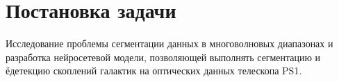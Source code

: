 \chapter{Постановка задачи}
\label{cha:ch_1}

Исследование проблемы сегментации данных в многоволновых диапазонах и разработка нейросетевой 
модели, позволяющей выполнять сегментацию и ёдетекцию скоплений галактик на оптических данных телескопа PS1.\\


